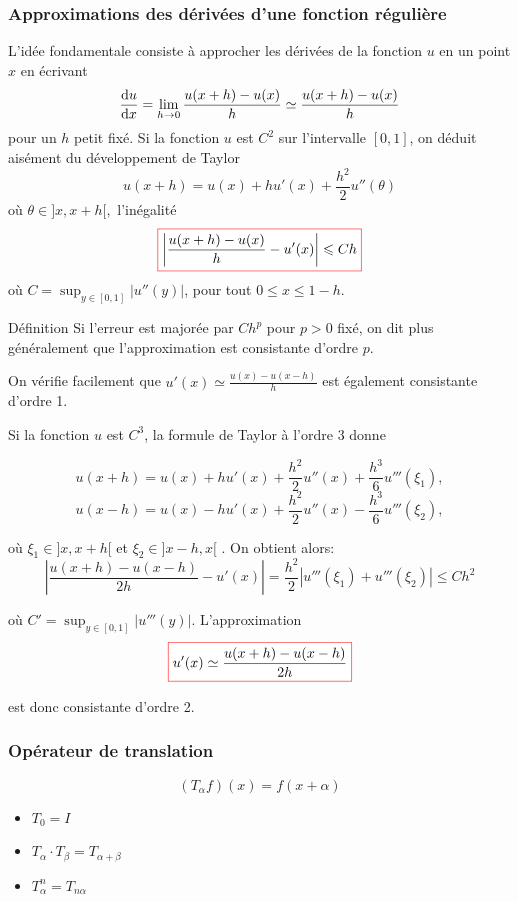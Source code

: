 \documentclass{beamer}
\def \de {{\rm d}}
\newcommand{\myredbox}[1]{\fcolorbox{red}{white}{$\displaystyle#1$}}
\begin{document}
\begin{frame}
\frametitle{Approximations des dérivées d'une fonction régulière}
 L'idée fondamentale consiste à approcher les dérivées de la fonction $u$ en un point $x$ en écrivant
\[\frac{\de u}{\de x} =\lim_{h\to 0} \frac{u(x+h)-u(x)}{h}\simeq  \frac{u(x+h)-u(x)}{h} \]
pour un $h$ petit fixé. 
 Si la fonction $u$ est $C^2$ sur l'intervalle $[0, 1]$, on déduit aisément du développement de Taylor
\[u(x+h)=u(x)+h u'(x)+\frac{h^2}2 u''(\theta) \]
où $\theta \in ]x, x + h[,$ l'inégalité
\[\myredbox{\left|\frac{u(x+h)-u(x)}h- u'(x)\right| \leqslant C h }\]
 où $C = \sup_{y\in [0,1]} |u''(y)|$, pour tout $0 \leqslant x \leqslant 1 - h$.
\begin{block}{Définition}
Si l'erreur est majorée par $C h^p$ pour $p > 0$ fixé, on dit plus généralement que l'approximation est consistante d'ordre $p$.
\end{block}


\end{frame}

\begin{frame}
On vérifie facilement que $u'(x) \simeq \frac{u(x) - u(x - h)}h$
est également consistante d'ordre 1.

Si la fonction $u$ est $C^3$, la formule de Taylor à l'ordre 3 donne

\[u(x+h)=u(x)+h u'(x)+\frac{h^2}2 u''(x)+\frac{h^3}6 u'''(\xi_1) ,\]
\[u(x-h)=u(x)-h u'(x)+\frac{h^2}2 u''(x)-\frac{h^3}6 u'''(\xi_2) ,\]

où $\xi_1\in ]x,x+h[$ et $\xi_2\in ]x-h,x[$ . On obtient alors:
\[\left| \frac{u(x+h)-u(x-h)}{2h}- u'(x) \right|=\frac{h^2}{2}\left| u'''(\xi_1)+u'''(\xi_2) \right|  \leqslant C h^2 \]




 où $C'=\sup_{y\in[0,1]} |u'''(y)|$. L'approximation
\[\myredbox{u'(x)\simeq \frac{u(x+h)-u(x-h)}{2h}}\] 
 
est donc consistante d'ordre 2.
\end{frame}

\begin{frame}
\frametitle{Opérateur de translation}
\[\left(T_\alpha f\right)(x) = f(x+\alpha)\]
\begin{center}
\end{center}
\begin{itemize}
\item $T_0 =I$
\item $T_{\alpha} \cdot T_{\beta} = T_{\alpha+\beta}$
\item $T^n_{\alpha}  = T_{n\alpha}$
\end{itemize}

\end{frame}
\end{document}

